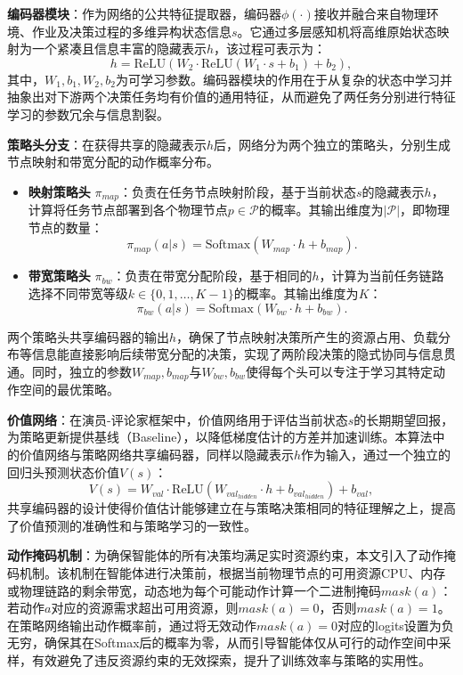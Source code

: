 \textbf{编码器模块}：作为网络的公共特征提取器，编码器$\phi(\cdot)$接收并融合来自物理环境、作业及决策过程的多维异构状态信息$s$。它通过多层感知机将高维原始状态映射为一个紧凑且信息丰富的隐藏表示$h$，该过程可表示为：
\begin{equation}
h = \text{ReLU}(W_2 \cdot \text{ReLU}(W_1 \cdot s + b_1) + b_2),
\end{equation}
其中，$W_1, b_1, W_2, b_2$为可学习参数。编码器模块的作用在于从复杂的状态中学习并抽象出对下游两个决策任务均有价值的通用特征，从而避免了两任务分别进行特征学习的参数冗余与信息割裂。

\textbf{策略头分支}：在获得共享的隐藏表示$h$后，网络分为两个独立的策略头，分别生成节点映射和带宽分配的动作概率分布。
\begin{itemize}
\item \textbf{映射策略头} $\pi_{map}$：负责在任务节点映射阶段，基于当前状态$s$的隐藏表示$h$，计算将任务节点部署到各个物理节点$p \in \mathcal{P}$的概率。其输出维度为$|\mathcal{P}|$，即物理节点的数量：
\begin{equation}
\pi_{map}(a|s) = \text{Softmax}(W_{map} \cdot h + b_{map}).
\end{equation}

\item \textbf{带宽策略头} $\pi_{bw}$：负责在带宽分配阶段，基于相同的$h$，计算为当前任务链路选择不同带宽等级$k \in \{0, 1, \dots, K-1\}$的概率。其输出维度为$K$：
\begin{equation}
\pi_{bw}(a|s) = \text{Softmax}(W_{bw} \cdot h + b_{bw}).
\end{equation}
\end{itemize}
两个策略头共享编码器的输出$h$，确保了节点映射决策所产生的资源占用、负载分布等信息能直接影响后续带宽分配的决策，实现了两阶段决策的隐式协同与信息贯通。同时，独立的参数$W_{map}, b_{map}$与$W_{bw}, b_{bw}$使得每个头可以专注于学习其特定动作空间的最优策略。

\textbf{价值网络}：在演员-评论家框架中，价值网络用于评估当前状态$s$的长期期望回报，为策略更新提供基线（Baseline），以降低梯度估计的方差并加速训练。本算法中的价值网络与策略网络共享编码器，同样以隐藏表示$h$作为输入，通过一个独立的回归头预测状态价值$V(s)$：
\begin{equation}
V(s) = W_{val} \cdot \text{ReLU}(W_{val_{hidden}} \cdot h + b_{val_{hidden}}) + b_{val},
\end{equation}
共享编码器的设计使得价值估计能够建立在与策略决策相同的特征理解之上，提高了价值预测的准确性和与策略学习的一致性。

\textbf{动作掩码机制}：为确保智能体的所有决策均满足实时资源约束，本文引入了动作掩码机制。该机制在智能体进行决策前，根据当前物理节点的可用资源CPU、内存或物理链路的剩余带宽，动态地为每个可能动作计算一个二进制掩码$mask(a)$：若动作$a$对应的资源需求超出可用资源，则$mask(a)=0$，否则$mask(a)=1$。在策略网络输出动作概率前，通过将无效动作$mask(a)=0$对应的logits设置为负无穷，确保其在Softmax后的概率为零，从而引导智能体仅从可行的动作空间中采样，有效避免了违反资源约束的无效探索，提升了训练效率与策略的实用性。

